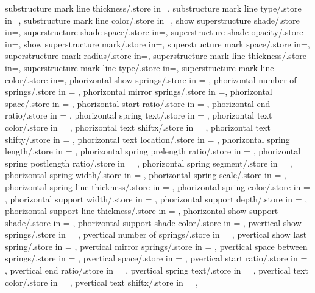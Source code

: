 {substructure mark line thickness/.store in=\marksslinet,
substructure mark line type/.store in=\marksslinetype,
substructure mark line color/.store in=\marksslinecolor,
show superstructure shade/.store in=\showsupershade,
superstructure shade space/.store in=\supershadespace,
superstructure shade opacity/.store in=\supershadeopacity,
show superstructure mark/.store in=\showmarksuper,
superstructure mark space/.store in=\marksuperexspace,
superstructure mark radius/.store in=\marksuperrad,
superstructure mark line thickness/.store in=\marksuperlinet,
superstructure mark line type/.store in=\marksuperlinetype,
superstructure mark line color/.store in=\marksuperlinecolor,
phorizontal show springs/.store in = \showphorizontalsprings,
phorizontal number of springs/.store in = \phorspringnumber,
phorizontal mirror springs/.store in =\phormirrorspring,
phorizontal space/.store in = \phorspringspace,
phorizontal start ratio/.store in = \phorspringstartratio,
phorizontal end ratio/.store in = \phorspringendratio,
phorizontal spring text/.store in = \phorspringtext,
phorizontal text color/.store in = \phortextcolor,
phorizontal text shiftx/.store in = \phortextshiftx,
phorizontal text shifty/.store in = \phortextshifty,
phorizontal text location/.store in = \phortextloc,
phorizontal spring length/.store in = \phorspringlength,
phorizontal spring prelength ratio/.store in = \phorprelenratio,
phorizontal spring postlength ratio/.store in = \phorpostlenratio,
phorizontal spring segment/.store in = \phorsegm,
phorizontal spring width/.store in = \phorsprwid,
phorizontal spring scale/.store in = \phorsprscale,
phorizontal spring line thickness/.store in = \phorsprlinethk,
phorizontal spring color/.store in = \phorsprcolor,
phorizontal support width/.store in = \phorsuppwidth,
phorizontal support depth/.store in = \phorsuppdepth,
phorizontal support line thickness/.store in = \phorsupplinethk,
phorizontal show support shade/.store in = \phorshowsuppshade,
phorizontal support shade color/.store in = \phorsuppshadecol,
pvertical show springs/.store in = \showpverticalsprings,
pvertical number of springs/.store in = \pverspringnumber,
pvertical show last spring/.store in = \pvershowlastspring,
pvertical mirror springs/.store in = \pvermirrorspring,
pvertical space between springs/.store in = \pverspbtwspr,
pvertical space/.store in = \pverspringspace,
pvertical start ratio/.store in = \pverspringstartratio,
pvertical end ratio/.store in = \pverspringendratio,
pvertical spring text/.store in = \pverspringtext,
pvertical text color/.store in = \pvertextcolor,
pvertical text shiftx/.store in = \pvertextshiftx,
}
